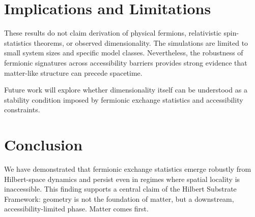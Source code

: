 \documentclass[11pt]{article}
\begin{document}
\section{Implications and Limitations}
These results do not claim derivation of physical fermions, relativistic spin-statistics theorems, or observed dimensionality. The simulations are limited to small system sizes and specific model classes. Nevertheless, the robustness of fermionic signatures across accessibility barriers provides strong evidence that matter-like structure can precede spacetime.

Future work will explore whether dimensionality itself can be understood as a stability condition imposed by fermionic exchange statistics and accessibility constraints.

\section{Conclusion}
We have demonstrated that fermionic exchange statistics emerge robustly from Hilbert-space dynamics and persist even in regimes where spatial locality is inaccessible. This finding supports a central claim of the Hilbert Substrate Framework: geometry is not the foundation of matter, but a downstream, accessibility-limited phase. Matter comes first.
\end{document}
